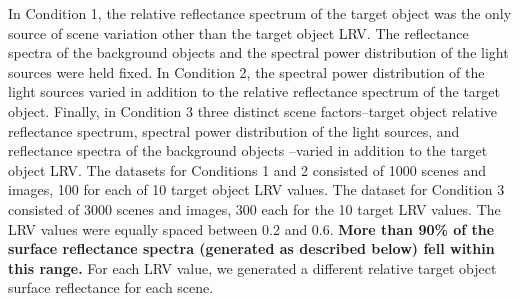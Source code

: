 \documentclass{jov}
\providecommand{\DIFaddtex}[1]{{\bf #1}} %
\providecommand{\DIFaddbegin}{} %
\providecommand{\DIFaddend}{} %
\providecommand{\DIFadd}[1]{\texorpdfstring{\DIFaddtex{#1}}{#1}} %
\newcommand{\DIFaddincludegraphics}[2][]{{\color{blue}\fbox{\DIFOincludegraphics[#1]{#2}}}} %
\DeclareRobustCommand{\DIFaddbegin}{\DIFOaddbegin \let\includegraphics\DIFaddincludegraphics} %
\DeclareRobustCommand{\DIFaddend}{\DIFOaddend \let\includegraphics\DIFOincludegraphics} %
\begin{document}
In Condition 1, the relative reflectance spectrum of the target object was the only source of scene variation other than the target object LRV.
The reflectance spectra of the background objects and the spectral power distribution of the light sources were held fixed.
In Condition 2, the spectral power distribution of the light sources varied in addition to the relative reflectance spectrum of the target object.
Finally, in Condition 3 three distinct scene factors--target object relative reflectance spectrum, spectral power distribution of the light sources, and reflectance spectra of the background objects
--varied in addition to the target object LRV.
The datasets for Conditions 1 and 2 consisted of 1000 scenes and images, 100 for each of 10 target object LRV values. 
The dataset for Condition 3 consisted of 3000 scenes and images, 300 each for the 10 target LRV values.
The LRV values were equally spaced between 0.2 and 0.6.
\DIFaddbegin \DIFadd{More than 90\% of the surface reflectance spectra (generated as described below) fell within this range.
}\DIFaddend For each LRV value, we generated a different relative target object surface reflectance for each scene. 
\end{document}
